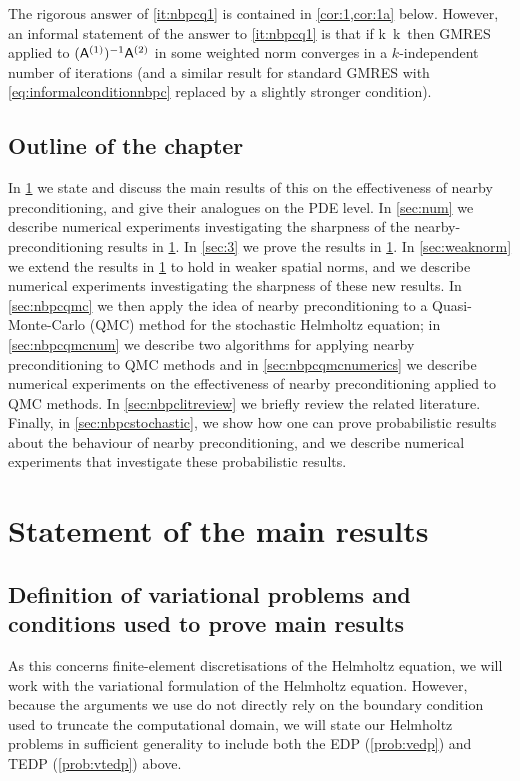  The rigorous answer of \cref{it:nbpcq1} is contained in \cref{cor:1,cor:1a} below. However, an informal statement of the answer to \cref{it:nbpcq1} is that if
 \beq\label{eq:informalconditionnbpc}
k\,
\NLi{\Aso-\Ast} \quad{} \quad k\,\NLi{\nso-\nst}
\quad{}
\eeq
then GMRES applied to $(\mathsf{A}^{(1)})^{-1}\mathsf{A}^{(2)}$ in some weighted norm converges in a $k$-independent number of iterations (and a similar result for standard GMRES with \cref{eq:informalconditionnbpc} replaced by a slightly stronger condition).

 \subsection{Outline of the chapter}%
In \cref{sec:main} we state and discuss the main results of this  on the effectiveness of nearby preconditioning, and give their analogues on the PDE level. In \cref{sec:num} we describe numerical experiments investigating the sharpness of the nearby-preconditioning results in \cref{sec:main}. In \cref{sec:3} we prove the results in \cref{sec:main}. In \cref{sec:weaknorm} we extend the results in \cref{sec:main} to hold in weaker spatial norms, and we describe numerical experiments investigating the sharpness of these new results. In \cref{sec:nbpcqmc} we then apply the idea of nearby preconditioning to a Quasi-Monte-Carlo (QMC) method for the stochastic Helmholtz equation; in \cref{sec:nbpcqmcnum} we describe two algorithms for applying nearby preconditioning to QMC methods and in \cref{sec:nbpcqmcnumerics} we describe numerical experiments on the effectiveness of nearby preconditioning applied to QMC methods. In \cref{sec:nbpclitreview} we briefly review the related literature. Finally, in \cref{sec:nbpcstochastic}, we show how one can prove probabilistic results about the behaviour of nearby preconditioning, and we describe numerical experiments that investigate these probabilistic results.

\section{Statement of the main results}\label{sec:main}

\subsection{Definition of variational problems and conditions used to prove main results}\label{sec:vpGm}
As this  concerns finite-element discretisations of the Helmholtz equation, we will work with the variational formulation of the Helmholtz equation. However, because the arguments we use do not directly rely on the boundary condition used to truncate the computational domain, we will state our Helmholtz problems in sufficient generality to include both the EDP (\cref{prob:vedp}) and TEDP (\cref{prob:vtedp}) above.

